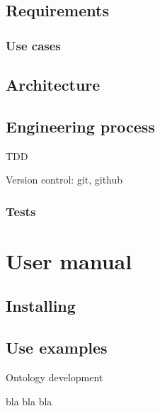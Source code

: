 \documentclass{report}
\begin{document}
\section{Requirements}

\subsection{Use cases}

\section{Architecture}

\section{Engineering process}

TDD

Version control: git, github

\subsection{Tests}

\chapter{User manual}

\section{Installing}

\section{Use examples}


Ontology development

bla bla bla \cite{vrandevcic06}



\end{document}

